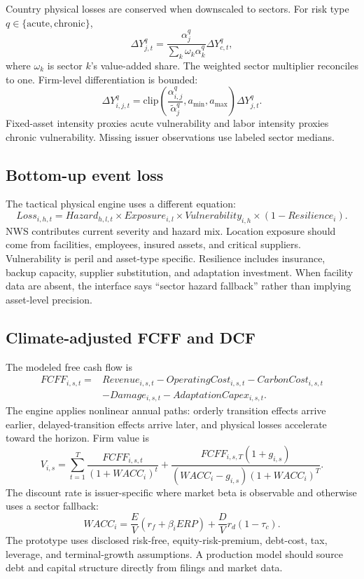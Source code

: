 \documentclass[10pt]{article}
\begin{document}
Country physical losses are conserved when downscaled to sectors. For risk type $q\in\{\mathrm{acute},\mathrm{chronic}\}$,
\begin{equation}
\Delta Y^{q}_{j,t}=\frac{\alpha^{q}_{j}}{\sum_k \omega_k\alpha^{q}_{k}}\Delta Y^{q}_{c,t},
\end{equation}
where $\omega_k$ is sector $k$'s value-added share. The weighted sector multiplier reconciles to one. Firm-level differentiation is bounded:
\begin{equation}
\Delta Y^{q}_{i,j,t}=
\mathrm{clip}\!\left(\frac{\alpha^{q}_{i,j}}{\widetilde{\alpha}^{q}_{j}},a_{\min},a_{\max}\right)
\Delta Y^{q}_{j,t}.
\end{equation}
Fixed-asset intensity proxies acute vulnerability and labor intensity proxies chronic vulnerability. Missing issuer observations use labeled sector medians.

\subsection{Bottom-up event loss}

The tactical physical engine uses a different equation:
\begin{equation}
Loss_{i,h,t}=Hazard_{h,l,t}\times Exposure_{i,l}\times Vulnerability_{i,h}\times(1-Resilience_i).
\end{equation}
NWS contributes current severity and hazard mix. Location exposure should come from facilities, employees, insured assets, and critical suppliers. Vulnerability is peril and asset-type specific. Resilience includes insurance, backup capacity, supplier substitution, and adaptation investment. When facility data are absent, the interface says ``sector hazard fallback'' rather than implying asset-level precision.

\subsection{Climate-adjusted FCFF and DCF}

The modeled free cash flow is
\begin{align}
FCFF_{i,s,t}={}&Revenue_{i,s,t}-OperatingCost_{i,s,t}-CarbonCost_{i,s,t}\nonumber\\
&-Damage_{i,s,t}-AdaptationCapex_{i,s,t}.
\end{align}
The engine applies nonlinear annual paths: orderly transition effects arrive earlier, delayed-transition effects arrive later, and physical losses accelerate toward the horizon. Firm value is
\begin{equation}
V_{i,s}=\sum_{t=1}^{T}\frac{FCFF_{i,s,t}}{(1+WACC_i)^t}
+\frac{FCFF_{i,s,T}(1+g_{i,s})}{(WACC_i-g_{i,s})(1+WACC_i)^T}.
\end{equation}
The discount rate is issuer-specific where market beta is observable and otherwise uses a sector fallback:
\begin{equation}
WACC_i=\frac{E}{V}(r_f+\beta_i ERP)+\frac{D}{V}r_d(1-\tau_c).
\end{equation}
The prototype uses disclosed risk-free, equity-risk-premium, debt-cost, tax, leverage, and terminal-growth assumptions. A production model should source debt and capital structure directly from filings and market data.
\end{document}

